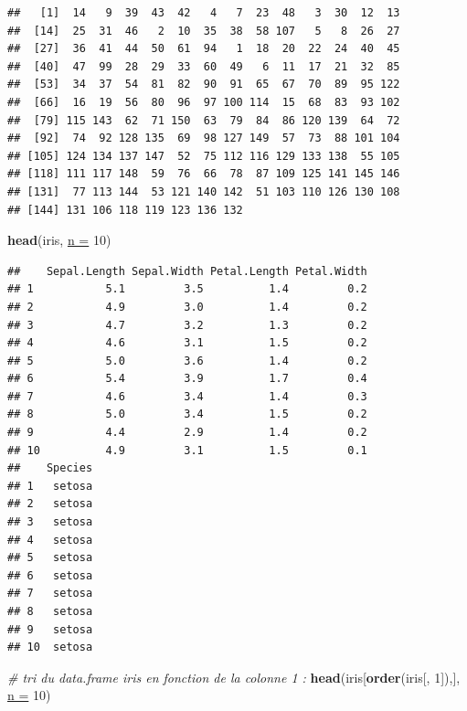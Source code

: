 \documentclass[twoside,symmetric]{book}
\newenvironment{Shaded}{}{}
\newcommand{\CommentTok}[1]{\textit{#1}}
\newcommand{\DataTypeTok}[1]{\underline{#1}}
\newcommand{\DecValTok}[1]{#1}
\newcommand{\KeywordTok}[1]{\textbf{#1}}
\newcommand{\NormalTok}[1]{#1}
\begin{document}
\begin{verbatim}
##   [1]  14   9  39  43  42   4   7  23  48   3  30  12  13
##  [14]  25  31  46   2  10  35  38  58 107   5   8  26  27
##  [27]  36  41  44  50  61  94   1  18  20  22  24  40  45
##  [40]  47  99  28  29  33  60  49   6  11  17  21  32  85
##  [53]  34  37  54  81  82  90  91  65  67  70  89  95 122
##  [66]  16  19  56  80  96  97 100 114  15  68  83  93 102
##  [79] 115 143  62  71 150  63  79  84  86 120 139  64  72
##  [92]  74  92 128 135  69  98 127 149  57  73  88 101 104
## [105] 124 134 137 147  52  75 112 116 129 133 138  55 105
## [118] 111 117 148  59  76  66  78  87 109 125 141 145 146
## [131]  77 113 144  53 121 140 142  51 103 110 126 130 108
## [144] 131 106 118 119 123 136 132
\end{verbatim}

\begin{Shaded}
\begin{Highlighting}[]
\KeywordTok{head}\NormalTok{(iris, }\DataTypeTok{n =} \DecValTok{10}\NormalTok{)}
\end{Highlighting}
\end{Shaded}

\begin{verbatim}
##    Sepal.Length Sepal.Width Petal.Length Petal.Width
## 1           5.1         3.5          1.4         0.2
## 2           4.9         3.0          1.4         0.2
## 3           4.7         3.2          1.3         0.2
## 4           4.6         3.1          1.5         0.2
## 5           5.0         3.6          1.4         0.2
## 6           5.4         3.9          1.7         0.4
## 7           4.6         3.4          1.4         0.3
## 8           5.0         3.4          1.5         0.2
## 9           4.4         2.9          1.4         0.2
## 10          4.9         3.1          1.5         0.1
##    Species
## 1   setosa
## 2   setosa
## 3   setosa
## 4   setosa
## 5   setosa
## 6   setosa
## 7   setosa
## 8   setosa
## 9   setosa
## 10  setosa
\end{verbatim}

\begin{Shaded}
\begin{Highlighting}[]
\CommentTok{# tri du data.frame iris en fonction de la colonne 1 :}
\KeywordTok{head}\NormalTok{(iris[}\KeywordTok{order}\NormalTok{(iris[, }\DecValTok{1}\NormalTok{]),], }\DataTypeTok{n =} \DecValTok{10}\NormalTok{)}
\end{Highlighting}
\end{Shaded}
\end{document}
